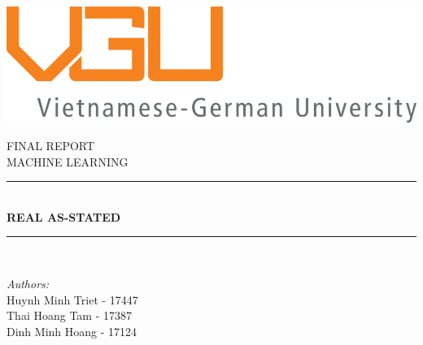 \begin{titlepage}

\newcommand{\HRule}{\rule{\linewidth}{0.5mm}} %

\centering
\includegraphics{./title/Logo20.png}


 

\center %


\textsc{\LARGE FINAL REPORT}\\[1.5cm] 
\textsc{\large MACHINE LEARNING}\\[0.5cm] 

\makeatletter
\HRule \\[0.6cm]
{ \huge \bfseries REAL AS-STATED }\\[0.2cm] %
\HRule \\[1.5cm]
 

\begin{minipage}{0.5\textwidth}
\begin{flushleft} \large
\emph{Authors:}\\
Huynh Minh Triet - 17447\\
Thai Hoang Tam - 17387\\
Dinh Minh Hoang - 17124\\




\end{flushleft}
\end{minipage}
\end{titlepage}
